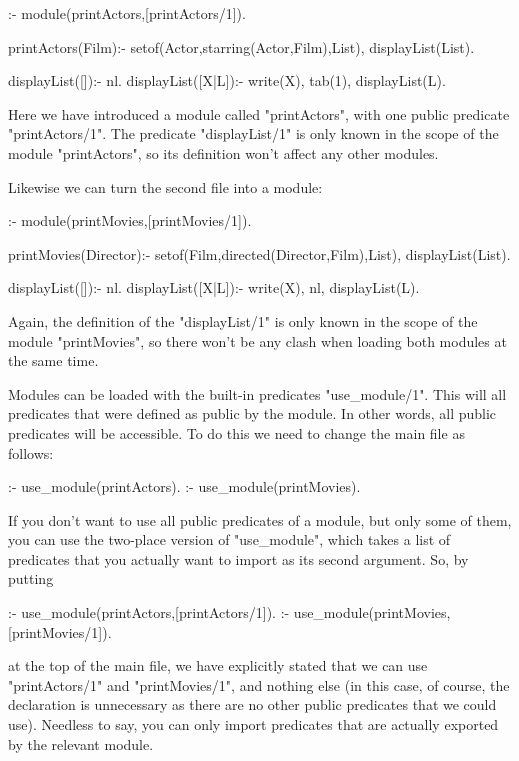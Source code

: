 \begin{LPNcodedisplay}

:- module(printActors,[printActors/1]).

printActors(Film):-
   setof(Actor,starring(Actor,Film),List),
   displayList(List).

displayList([]):- nl.
displayList([X|L]):-
   write(X), tab(1),
   displayList(L).
\end{LPNcodedisplay}
Here we have introduced a module called "printActors",
with one public predicate "printActors/1". The predicate
"displayList/1" is only known in the scope of the module
"printActors", so its definition won't affect any other
modules.

Likewise we can turn the second file into a module:

\begin{LPNcodedisplay}

:- module(printMovies,[printMovies/1]).

printMovies(Director):-
   setof(Film,directed(Director,Film),List),
   displayList(List).

displayList([]):- nl.
displayList([X|L]):-
   write(X), nl,
   displayList(L).
\end{LPNcodedisplay}
Again, the  definition of the
"displayList/1" is only known in the scope of the module
"printMovies", so there won't be any
clash when loading both modules at the same time.

Modules can be loaded with the built-in predicates "use\_module/1".
This will  all predicates that were defined as public
by the module. In other words, all public predicates will be
accessible. To do this we need to change the main file as follows:

\begin{LPNcodedisplay}

:- use_module(printActors).
:- use_module(printMovies).
\end{LPNcodedisplay}

If you don't want to use all public predicates of a module, but only
some of them, you can use the two-place version of "use\_module", which
takes a list of predicates that you actually want to import as its
 second argument.
So, by putting

\begin{LPNcodedisplay}

:- use_module(printActors,[printActors/1]).
:- use_module(printMovies,[printMovies/1]).
\end{LPNcodedisplay}
at the top of the main file, we have explicitly stated that we
can use "printActors/1" and "printMovies/1", and nothing else (in this
case, of course, the declaration is unnecessary as there are no other
public predicates that we could use).  Needless to say, you can only
import predicates that are actually exported by the relevant module.



